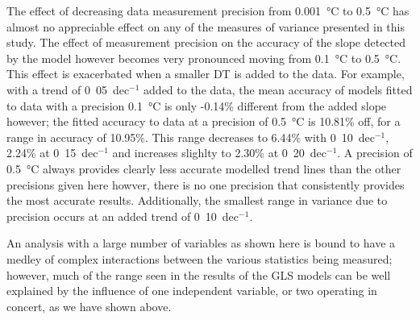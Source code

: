 \documentclass{ametsoc}
\begin{document}
The effect of decreasing data measurement precision from \SI{0.001}{\degreeCelsius} to \SI{0.5}{\degreeCelsius} has almost no appreciable effect on any of the measures of variance presented in this study. The effect of measurement precision on the accuracy of the slope detected by the model however becomes very pronounced moving from \SI{0.1}{\degreeCelsius} to \SI{0.5}{\degreeCelsius}. This effect is exacerbated when a smaller DT is added to the data. For example, with a trend of \si{0.05}{\degreeCelsius}~dec$^{-1}$ added to the data, the mean accuracy of models fitted to data with a precision \SI{0.1}{\degreeCelsius} is only -0.14\% different from the added slope however; the fitted accuracy to data at a precision of \SI{0.5}{\degreeCelsius} is 10.81\% off, for a range in accuracy of 10.95\%. This range decreases to 6.44\% with \si{0.10}{\degreeCelsius}~dec$^{-1}$, 2.24\% at \si{0.15}{\degreeCelsius}~dec$^{-1}$ and increases slighlty to 2.30\% at \si{0.20}{\degreeCelsius}~dec$^{-1}$. A precision of \SI{0.5}{\degreeCelsius} always provides clearly less accurate modelled trend lines than the other precisions given here howver, there is no one precision that consistently provides the most accurate results. Additionally, the smallest range in variance due to precision occurs at an added trend of \si{0.10}{\degreeCelsius}~dec$^{-1}$.

An analysis with a large number of variables as shown here is bound to have a medley of complex interactions between the various statistics being measured; however, much of the range seen in the results of the GLS models can be well explained by the influence of one independent variable, or two operating in concert, as we have shown above.

\end{document}
